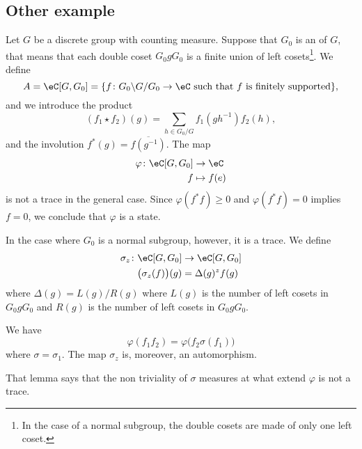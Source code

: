 					\subsection{Other example}

Let $G$ be a discrete group with counting measure. Suppose that $G_0$ is an  of $G$, that means that each double coset $G_0gG_0$ is a finite union of left cosets\footnote{In the case of a normal subgroup, the double cosets are made of only one left coset.}. We define
\begin{equation}
	A=\eC[G,G_0]=\{ f\colon G_0\backslash G/G_0\to \eC\text{ such that $f$ is finitely supported} \},
\end{equation}
and we introduce the product
\begin{equation}
	(f_1\star f_2)(g)=\sum_{h\in G_0/G}f_1(gh^{-1})f_2(h),
\end{equation}
and the involution $f^*(g)=\overline{ f(g^{-1}) }$.  The map
\begin{equation}
\begin{aligned}
 \varphi\colon \eC[G,G_0]&\to \eC \\ 
   f&\mapsto f(e) 
\end{aligned}
\end{equation}
is not a trace in the general case. Since $\varphi(f^*f)\geq0$ and $\varphi(f^*f)=0$ implies $f=0$, we conclude that $\varphi$ is a state.

In the case where $G_0$ is a normal subgroup, however, it is a trace. We define
\begin{equation}
\begin{aligned}
 \sigma_z\colon \eC[G,G_0]&\to \eC[G,G_0] \\ 
   \big( \sigma_z(f) \big)(g)& = \Delta(g)^zf(g) 
\end{aligned}
\end{equation}
where $\Delta(g)=L(g)/R(g)$ where $L(g)$ is the number of left cosets in $G_0gG_0$ and $R(g)$ is the number of left cosets in $G_0gG_0$.

\begin{lemma}
	We have
	\begin{equation}
		\varphi(f_1f_2)=\varphi\big( f_2\sigma(f_1) \big)
	\end{equation}
	where $\sigma=\sigma_1$. The map $\sigma_z$ is, moreover, an automorphism.
\end{lemma}
That lemma says that the non triviality of $\sigma$ measures at what extend $\varphi$ is not a trace.

